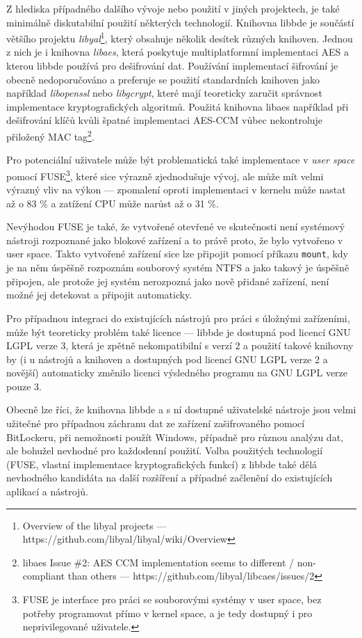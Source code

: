 Z hlediska případného dalšího vývoje nebo použití v jiných projektech, je také minimálně diskutabilní použití některých technologií. Knihovna libbde je součástí většího projektu \emph{libyal}\footnote{Overview of the libyal projects --- https://github.com/libyal/libyal/wiki/Overview}, který obsahuje několik desítek různých knihoven. Jednou z nich je i knihovna \emph{libaes}, která poskytuje multiplatformní implementaci AES a kterou libbde používá pro dešifrování dat. Používání  implementací šifrování je obecně nedoporučováno a preferuje se použití standardních knihoven jako například \emph{libopenssl} nebo \emph{libgcrypt}, které mají teoreticky zaručit správnost implementace kryptografických algoritmů. Použitá knihovna libaes například při dešifrování klíčů kvůli špatné implementaci AES-CCM vůbec nekontroluje přiložený MAC tag\footnote{libaes Issue \#2: AES CCM implementation seems to different / non-compliant than others --- https://github.com/libyal/libcaes/issues/2}.

Pro potenciální uživatele může být problematická také implementace v \emph{user space} pomocí FUSE\footnote{FUSE je interface pro práci se souborovými systémy v user space, bez potřeby programovat přímo v kernel space, a je tedy dostupný i pro neprivilegované uživatele\cite{Singh2014}.}, které sice výrazně zjednodušuje vývoj, ale může mít velmi výrazný vliv na výkon --- zpomalení oproti implementaci v kernelu může nastat až o 83 \% a zatížení CPU může narůst až o 31 \%\cite{Vangoor2017}.

Nevýhodou FUSE je také, že vytvořené otevřené  ve skutečnosti není systémový nástroji rozpoznané jako blokové zařízení a to právě proto, že bylo vytvořeno v user space. Takto vytvořené zařízení sice lze připojit pomocí příkazu \texttt{mount}, kdy je na něm úspěšně rozpoznám souborový systém NTFS a jako takový je úspěšně připojen, ale protože jej systém nerozpozná jako nově přidané zařízení, není možné jej detekovat a připojit automaticky.

Pro případnou integraci do existujících nástrojů pro práci s úložnými zařízeními, může být teoreticky problém také licence --- libbde je dostupná pod licencí GNU LGPL verze 3, která je zpětně nekompatibilní s verzí 2 a použití takové knihovny by (i u nástrojů a knihoven a dostupných pod licencí GNU LGPL verze 2 a novější) automaticky změnilo licenci výsledného programu na GNU LGPL verze pouze 3\cite{GNU2019}.

Obecně lze říci, že knihovna libbde a s ní dostupné uživatelské nástroje jsou velmi užitečné pro případnou záchranu dat ze zařízení zašifrovaného pomocí BitLockeru, při nemožnosti použít Windows, případně pro různou analýzu dat, ale bohužel nevhodné pro každodenní použití. Volba použitých technologií (FUSE, vlastní implementace kryptografických funkcí) z libbde také dělá nevhodného kandidáta na další rozšíření a případné začlenění do existujících aplikací a nástrojů.

